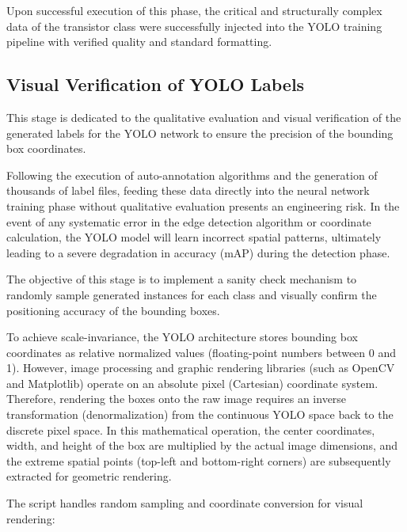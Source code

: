 \documentclass{article}
\begin{document}
Upon successful execution of this phase, the critical and structurally complex data of the transistor class were successfully injected into the YOLO training pipeline with verified quality and standard formatting.

\subsection{Visual Verification of YOLO Labels}

This stage is dedicated to the qualitative evaluation and visual verification of the generated labels for the YOLO network to ensure the precision of the bounding box coordinates.

Following the execution of auto-annotation algorithms and the generation of thousands of label files, feeding these data directly into the neural network training phase without qualitative evaluation presents an engineering risk. In the event of any systematic error in the edge detection algorithm or coordinate calculation, the YOLO model will learn incorrect spatial patterns, ultimately leading to a severe degradation in accuracy (mAP) during the detection phase.

The objective of this stage is to implement a sanity check mechanism to randomly sample generated instances for each class and visually confirm the positioning accuracy of the bounding boxes.

To achieve scale-invariance, the YOLO architecture stores bounding box coordinates as relative normalized values (floating-point numbers between 0 and 1). However, image processing and graphic rendering libraries (such as OpenCV and Matplotlib) operate on an absolute pixel (Cartesian) coordinate system. Therefore, rendering the boxes onto the raw image requires an inverse transformation (denormalization) from the continuous YOLO space back to the discrete pixel space. In this mathematical operation, the center coordinates, width, and height of the box are multiplied by the actual image dimensions, and the extreme spatial points (top-left and bottom-right corners) are subsequently extracted for geometric rendering.

The script handles random sampling and coordinate conversion for visual rendering:
\end{document}
